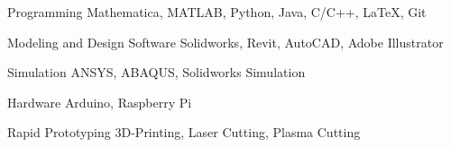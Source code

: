 

\begin{cvskills}

  \cvskill
    {Programming} %
    {Mathematica, MATLAB, Python, Java, C/C++, LaTeX, Git} %

  \cvskill
    {Modeling and Design Software} %
    {Solidworks, Revit, AutoCAD, Adobe Illustrator} %

  \cvskill
    {Simulation} %
    {ANSYS, ABAQUS, Solidworks Simulation} %

  \cvskill
    {Hardware} %
    {Arduino, Raspberry Pi} %
    
  \cvskill
    {Rapid Prototyping} %
    {3D-Printing, Laser Cutting, Plasma Cutting} %

\end{cvskills}
